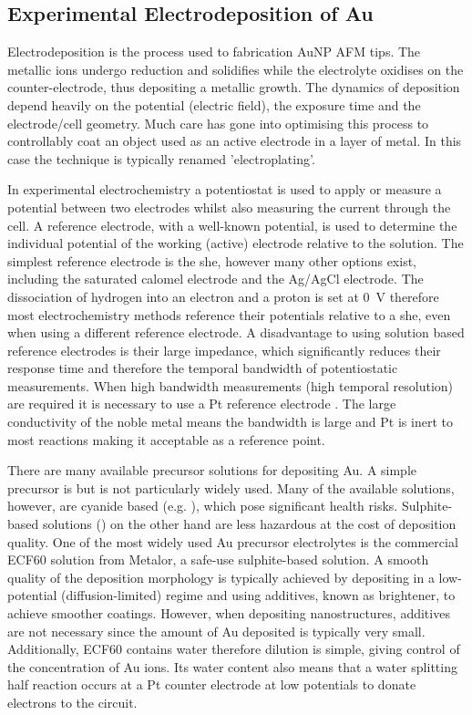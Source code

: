 \documentclass{article}
\begin{document}
\subsection{Experimental Electrodeposition of Au}

Electrodeposition is the process used to fabrication AuNP AFM tips. The metallic ions undergo reduction and solidifies while the electrolyte oxidises on the counter-electrode, thus depositing a metallic growth. The dynamics of deposition depend heavily on the potential (electric field), the exposure time and the electrode/cell geometry. Much care has gone into optimising this process to controllably coat an object used as an active electrode in a layer of metal. In this case the technique is typically renamed 'electroplating'.

In experimental electrochemistry a potentiostat is used to apply or measure a potential between two electrodes whilst also measuring the current through the cell. A reference electrode, with a well-known potential, is used to determine the individual potential of the working (active) electrode relative to the solution. %
The simplest reference electrode is the \gls{she}, however many other options exist, including the saturated calomel electrode and the Ag/AgCl electrode. The dissociation of hydrogen into an electron and a proton is set at \SI{0}{V} therefore most electrochemistry methods reference their potentials relative to a \gls{she}, even when using a different reference electrode. A disadvantage to using solution based reference electrodes is their large impedance, which significantly reduces their response time and therefore the temporal bandwidth of potentiostatic measurements. When high bandwidth measurements (high temporal resolution) are required it is necessary to use a Pt reference electrode \cite{sawyer1995electrochemistry}. The large conductivity of the noble metal means the bandwidth is large and Pt is inert to most reactions making it acceptable as a reference point.

There are many available precursor solutions for depositing Au. A simple precursor is  but is not particularly widely used. Many of the available solutions, however, are cyanide based (e.g. ), which  pose significant health risks. Sulphite-based solutions () on the other hand are less hazardous at the cost of deposition quality. One of the most widely used Au precursor electrolytes is the commercial ECF60 solution from Metalor, a safe-use sulphite-based solution. A smooth quality of the deposition morphology is typically achieved by depositing in a low-potential (diffusion-limited) regime and using additives, known as brightener, to achieve smoother coatings. However, when depositing nanostructures, additives are not necessary since the amount of Au deposited is typically very small.
Additionally, ECF60 contains water therefore dilution is simple, giving control of the concentration of Au ions. Its water content also means that a water splitting half reaction occurs at a Pt counter electrode at low potentials to donate electrons to the circuit.
\end{document}
